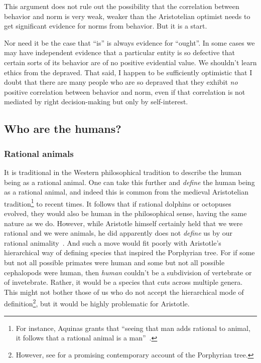 This argument does not rule out the possibility that the correlation between behavior and norm is very weak, weaker than the Aristotelian
optimist needs to get significant evidence for norms from behavior. But it is a start.

Nor need it be the case that ``is'' is always evidence for ``ought''. In some cases we may have independent evidence that a particular
entity is so defective that certain sorts of its behavior are of no positive evidential value. We shouldn't learn ethics from the 
depraved. That said, I happen to be sufficiently optimistic that I doubt that there are many people who are so depraved that they exhibit
\textit{no} positive correlation between behavior and norm, even if that correlation is not mediated by right decision-making but only
by self-interest.

\subsection{Who are the humans?}
\subsubsection{Rational animals}
It is traditional in the Western philosophical tradition to describe the human being as a rational animal. One can
take this further and \textit{define} the human being as a rational animal, and indeed this is common from the 
medieval Aristotelian tradition\footnote{For instance, Aquinas grants that ``seeing that man adds
rational to animal, it follows that a rational animal is a man''~\parencite[Q9 A1 Rp.~1]{AquinasPower3}.} to  
recent times. It follows that if rational dolphins or octopuses evolved, they would also be human in the philosophical sense, having the 
same nature as we do. However, while Aristotle himself certainly held that we were rational and we were animals, he did 
apparently does not \textit{define} us by our rational animality~\parencite{Kietzmann2019}.
And such a move would fit poorly with Aristotle's hierarchical
way of defining species that inspired the Porphyrian tree. For if some but not all possible primates were human and some 
but not all possible cephalopods were human, then \textit{human} couldn't be a subdivision of vertebrate or of invetebrate. Rather, 
it would be a species that cuts across multiple genera. This might not bother those of us who do not accept the hierarchical
mode of definition\footnote{However, see  for a promising contemporary account of the Porphyrian tree.}, but it would be 
highly problematic for Aristotle. 

